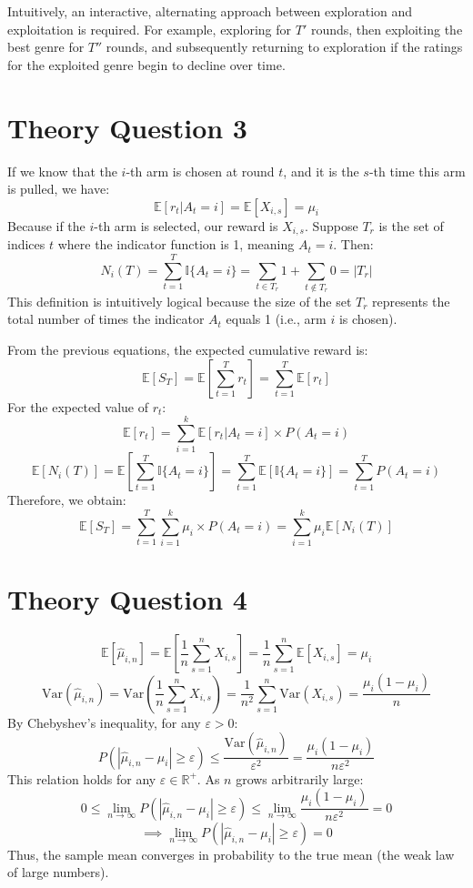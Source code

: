 \documentclass[12pt,a4paper]{article}
\begin{document}
Intuitively, an interactive, alternating approach between exploration and exploitation is required.
For example, exploring for $T'$ rounds, then exploiting the best genre for $T''$ rounds, and subsequently returning to exploration if the ratings for the exploited genre begin to decline over time.
%

\section*{Theory Question 3} %
If we know that the $i$-th arm is chosen at round $t$, and it is the $s$-th time this arm is pulled, we have: %
\[
\mathbb{E}[r_t | A_t = i] = \mathbb{E}[X_{i,s}] = \mu_i
\]
Because if the $i$-th arm is selected, our reward is $X_{i,s}$.
%
Suppose $T_r$ is the set of indices $t$ where the indicator function is 1, meaning $A_t = i$.
Then: %
\[
N_i(T) = \sum_{t=1}^T \mathbb{I}\{A_t = i\} = \sum_{t \in T_r} 1 + \sum_{t \notin T_r} 0 = |T_r|
\] %
This definition is intuitively logical because the size of the set $T_r$ represents the total number of times the indicator $A_t$ equals 1 (i.e., arm $i$ is chosen).
%

From the previous equations, the expected cumulative reward is: %
\[
\mathbb{E}[S_T] = \mathbb{E}\left[ \sum_{t=1}^T r_t \right] = \sum_{t=1}^T \mathbb{E}[r_t]
\] %
For the expected value of $r_t$: %
\[
\mathbb{E}[r_t] = \sum_{i=1}^k \mathbb{E}[r_t | A_t = i] \times P(A_t = i)
\] %
\[
\mathbb{E}[N_i(T)] = \mathbb{E}\left[ \sum_{t=1}^T \mathbb{I}\{A_t = i\} \right] = \sum_{t=1}^T \mathbb{E}[\mathbb{I}\{A_t = i\}] = \sum_{t=1}^T P(A_t = i)
\] %
Therefore, we obtain: %
\[
\mathbb{E}[S_T] = \sum_{t=1}^T \sum_{i=1}^k \mu_i \times P(A_t = i) = \sum_{i=1}^k \mu_i \mathbb{E}[N_i(T)]
\] %

\section*{Theory Question 4} %
\[
\mathbb{E}[\hat{\mu}_{i,n}] = \mathbb{E}\left[ \frac{1}{n} \sum_{s=1}^n X_{i,s} \right] = \frac{1}{n} \sum_{s=1}^n \mathbb{E}[X_{i,s}] = \mu_i
\] %
\[
\mathrm{Var}(\hat{\mu}_{i,n}) = \mathrm{Var}\left( \frac{1}{n} \sum_{s=1}^n X_{i,s} \right) = \frac{1}{n^2} \sum_{s=1}^n \mathrm{Var}(X_{i,s}) = \frac{\mu_i(1-\mu_i)}{n}
\] %
By Chebyshev's inequality, for any $\varepsilon>0$: %
\[
P\left(|\hat{\mu}_{i,n} - \mu_i| \geq \varepsilon\right) \leq \frac{\mathrm{Var}(\hat{\mu}_{i,n})}{\varepsilon^2} = \frac{\mu_i(1-\mu_i)}{n \varepsilon^2}
\] %
This relation holds for any $\varepsilon \in \mathbb{R}^+$.
As $n$ grows arbitrarily large: %
\[
0 \leq \lim_{n \to \infty} P\left(|\hat{\mu}_{i,n} - \mu_i| \geq \varepsilon\right) \leq \lim_{n \to \infty} \frac{\mu_i(1-\mu_i)}{n \varepsilon^2} = 0
\] %
\[
\implies \lim_{n \to \infty} P\left(|\hat{\mu}_{i,n} - \mu_i| \geq \varepsilon\right) = 0
\] %
Thus, the sample mean converges in probability to the true mean (the weak law of large numbers).
%
\end{document}
